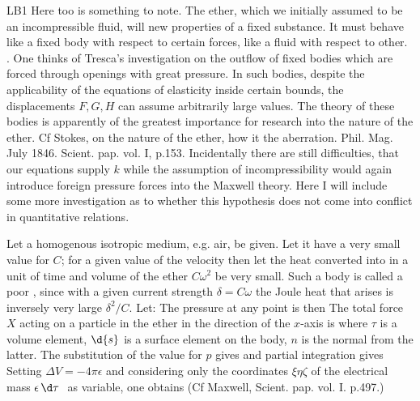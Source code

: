\begin{paper}{LB1}
Here too is something to note. The ether, which we initially assumed to be an incompressible fluid, will  new properties of a fixed substance. It must behave like a fixed body with respect to certain forces, like a fluid with respect to other. . One thinks of Tresca's investigation on the outflow of fixed bodies which are forced through openings with great pressure. In such bodies, despite the applicability of the equations of elasticity inside certain bounds, the displacements $F, G, H$ can assume arbitrarily large values. The theory of these bodies is apparently of the greatest importance for research into the nature of the ether. Cf Stokes, on the nature of the ether, how it  the aberration. Phil. Mag. July 1846. Scient. pap. vol. I, p.153. Incidentally there are still difficulties, that our equations supply $k$  while the assumption of incompressibility would again introduce foreign pressure forces into the Maxwell theory. Here I will include some more investigation as to whether this hypothesis does not come into conflict in quantitative relations.

Let a homogenous isotropic medium, e.g. air, be  given. Let it have a very small value for $C$; for a given value of the velocity
then let the heat converted into  in a unit of time and volume of the ether $C\omega^2$ be very small. Such a body is called a poor , since with a given current strength $\delta=C\omega$ the Joule heat that arises is inversely very large $\delta^2/C$. Let:
The pressure at any point is then
The total force $X$ acting on a particle in the ether in the direction of the $x$-axis is
where $\tau$ is a volume element, $\d{s}$ is a surface element on the body, $n$ is the normal from the latter. The substitution of the value for $p$ gives
and partial integration gives
Setting $\Delta V = -4\pi\epsilon$ and considering only the coordinates $\xi\eta\zeta$ of the electrical mass $\epsilon\D\tau$ as variable, one obtains
(Cf Maxwell, Scient. pap. vol. I. p.497.)


\end{paper}

